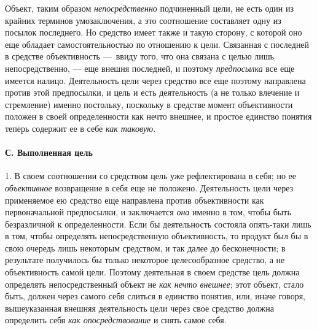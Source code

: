 \documentclass[twoside]{article}
\begin{document}
{{{{Объект, таким образом
{\em непосредственно}
подчиненный цели, не есть один из крайних терминов
умозаключения, а это соотношение составляет одну из посылок последнего. Но
средство имеет также и такую сторону, с которой оно еще обладает
самостоятельностью по отношению к цели. Связанная с последней в средстве
объективность —~ввиду того, что она связана с целью лишь
непосредственно, — еще внешня последней, и поэтому
{\em предпосылка} все еще
имеется налицо. Деятельность цели через средство все еще поэтому направлена
против этой предпосылки, и цель и есть деятельность (а не только влечение и
стремление) именно постольку, поскольку в средстве момент объективности
положен в своей определенности как нечто внешнее, и простое единство
понятия теперь содержит ее в себе
{\em как таковую}.

\paragraph[С.Выполненная цель]{С. Выполненная цель }
1. В своем соотношении со средством цель уже рефлектирована в
себя; но ее {\em объективное}
возвращение в себя еще не положено. Деятельность цели через
применяемое ею средство еще направлена против объективности как
первоначальной предпосылки, и заключается
{\em она} именно в том,
чтобы быть безразличной к определенности. Если бы деятельность состояла
опять-таки лишь в том, чтобы определять непосредственную объективность, то
продукт был бы в свою очередь лишь некоторым средством, и так далее до
бесконечности; в результате получилось бы только некоторое целесообразное
средство, а не объективность самой цели. Поэтому деятельная в своем
средстве цель должна определять непосредственный объект не
{\em как нечто внешнее};
этот объект, стало быть, должен через самого себя слиться в
единство понятия, или, иначе говоря, вышеуказанная внешняя деятельность
цели через свое средство должна определить себя
{\em как опосредствование}
и снять самое себя.

}}}}
\end{document}
